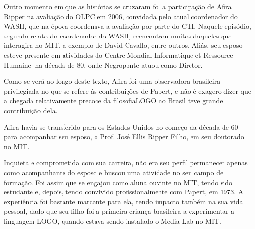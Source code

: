 \documentclass[
12pt,		%
openright,	%
twoside,  %
a4paper,			%
chapter=TITLE,		%
english,			%
french,				%
spanish,			%
brazil				%
]{USPSC-classe/USPSC}
\begin{document}
Outro momento em que as hist\'orias se cruzaram foi a participa\c{c}\~ao de Afira Ripper na avalia\c{c}\~ao do OLPC em 2006, convidada pelo atual coordenador do WASH, que na \'epoca coordenava a avalia\c{c}\~ao por parte do CTI. Naquele epis\'odio, segundo relato do coordenador do WASH, reencontrou muitos daqueles que interagira no MIT, a exemplo de David Cavallo, entre outros. Ali\'as, seu esposo esteve presente em atividades do Centre Mondial Informatique et Ressource Humaine, na d\'ecada de 80, onde Negroponte atuou como Diretor.

















Como se ver\'a ao longo deste texto, Afira foi uma observadora brasileira privilegiada no que se refere \`as contribui\c{c}\~oes de Papert, e n\~ao \'e exagero dizer que a chegada relativamente precoce da \textquotedbl filosofia\textquotedbl  LOGO no Brasil teve grande contribui\c{c}\~ao dela.

















Afira havia se transferido para os Estados Unidos no come\c{c}o da d\'ecada de 60 para acompanhar seu esposo, o Prof. Jos\'e Ellis Ripper Filho, em seu doutorado no MIT.

















Inquieta e comprometida com sua carreira, n\~ao era seu perfil permanecer apenas como acompanhante do esposo e buscou uma atividade no seu campo de forma\c{c}\~ao. Foi assim que se engajou como aluna ouvinte no MIT, tendo sido estudante e, depois, tendo convivido profissionalmente com Papert, em 1973. A experi\^encia foi bastante marcante para ela, tendo impacto tamb\'em na sua vida pessoal, dado que seu filho foi a primeira crian\c{c}a brasileira a experimentar a linguagem LOGO, quando estava sendo instalado o Media Lab no MIT.
\end{document}
